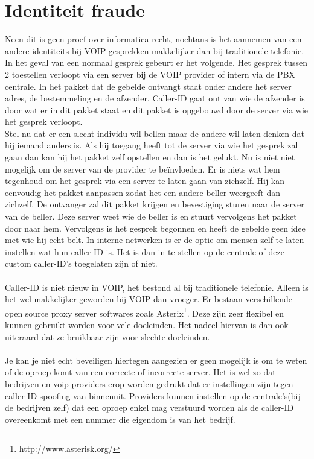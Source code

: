 \documentclass[pdftex,a4paper,12pt,twoside]{report}
\begin{document}
\newpage
\section{Identiteit fraude}
Neen dit is geen proef over informatica recht, nochtans is het aannemen van een andere identiteits bij VOIP gesprekken makkelijker dan bij traditionele telefonie. In het geval van een normaal gesprek gebeurt er het volgende. Het gesprek tussen 2 toestellen verloopt via een server bij de VOIP provider of intern via de PBX centrale. In het pakket dat de gebelde ontvangt staat onder andere het server adres, de bestemmeling en de afzender. Caller-ID gaat out van wie de afzender is door wat er in dit pakket staat en dit pakket is opgebouwd door de server via wie het gesprek verloopt.\\
Stel nu dat er een slecht individu wil bellen maar de andere wil laten denken dat hij iemand anders is. Als hij toegang heeft tot de server via wie het gesprek zal gaan dan kan hij het pakket zelf opstellen en dan is het gelukt. Nu is niet niet mogelijk om de server van de provider te beïnvloeden. Er is niets wat hem tegenhoud om het gesprek via een server te laten gaan van zichzelf. Hij kan eenvoudig het pakket aanpassen zodat het een andere beller weergeeft dan zichzelf. De ontvanger zal dit pakket krijgen en bevestiging sturen naar de server van de beller. Deze server weet wie de beller is en stuurt vervolgens het pakket door naar hem. Vervolgens is het gesprek begonnen en heeft de gebelde geen idee met wie hij echt belt. In interne netwerken is er de optie om mensen zelf te laten instellen wat hun caller-ID is. Het is dan in te stellen op de centrale of deze custom caller-ID's toegelaten zijn of niet.
\\ \\
Caller-ID is niet nieuw in VOIP, het bestond al bij traditionele telefonie. Alleen is het wel makkelijker geworden bij VOIP dan vroeger. Er bestaan verschillende open source proxy server softwares zoals Asterix\footnote{http://www.asterisk.org/}. Deze zijn zeer flexibel en kunnen gebruikt worden voor vele doeleinden. Het nadeel hiervan is dan ook uiteraard dat ze bruikbaar zijn voor slechte doeleinden. 
\\ \\
Je kan je niet echt beveiligen hiertegen aangezien er geen mogelijk is om te weten of de oproep komt van een correcte of incorrecte server. Het is wel zo dat bedrijven en voip providers erop worden gedrukt dat er instellingen zijn tegen caller-ID spoofing van binnenuit. Providers kunnen instellen op de centrale's(bij de bedrijven zelf) dat een oproep enkel mag verstuurd worden als de caller-ID overeenkomt met een nummer die eigendom is van het bedrijf.
\end{document}
